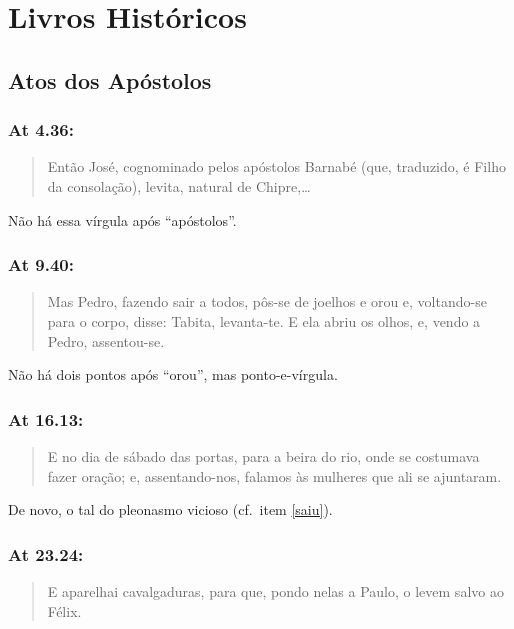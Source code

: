 \chapter{Livros Históricos}
\section{Atos dos Apóstolos}

\subsection{At 4.36:}
\begin{quote}
    \small
Então José, cognominado pelos apóstolos\uwave{,} Barnabé (que, traduzido, é Filho da consolação), levita, natural de Chipre,\ldots
\end{quote}

Não há essa vírgula após ``apóstolos''.


\subsection{At 9.40:}
\begin{quote}
    \small
Mas Pedro, fazendo sair a todos, pôs-se de joelhos e orou\uwave{:} e, voltando-se para o corpo, disse: Tabita, levanta-te. E ela abriu os olhos, e, vendo a Pedro, assentou-se.
\end{quote}

Não há dois pontos após ``orou'', mas ponto-e-vírgula.


\subsection{At 16.13:}
\begin{quote}
    \small
E no dia de sábado  das portas, para a beira do rio, onde se costumava fazer oração; e, assentando-nos, falamos às mulheres que ali se ajuntaram.
\end{quote}

De novo, o tal do pleonasmo vicioso (cf.~item \ref{saiu}).


\subsection{At 23.24:}
\begin{quote}
    \small
E aparelhai cavalgaduras, para que, pondo nelas a Paulo, o levem salvo ao  Félix.
\end{quote}

